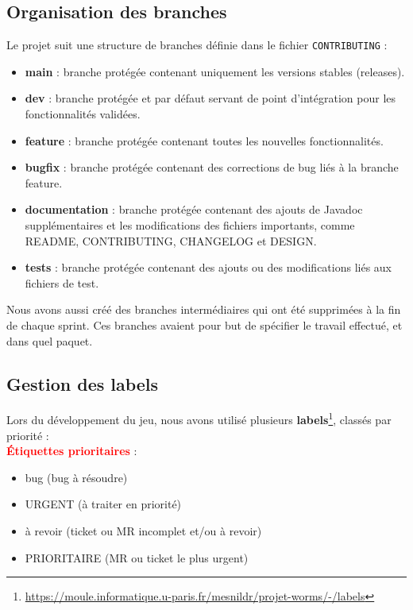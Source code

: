 \documentclass[a4paper, 12pt]{article}
\begin{document}
        \subsection{Organisation des branches}
            Le projet suit une structure de branches définie dans le fichier \texttt{CONTRIBUTING} :
            \begin{itemize}
                \item \textbf{main} : branche protégée contenant uniquement les versions stables (releases).
                \item \textbf{dev} : branche protégée et par défaut servant de point d'intégration pour les fonctionnalités validées.
                \item \textbf{feature} : branche protégée contenant toutes les nouvelles fonctionnalités.
                \item \textbf{bugfix} : branche protégée contenant des corrections de bug liés à la branche feature.
                \item \textbf{documentation} : branche protégée contenant des ajouts de Javadoc supplémentaires et les modifications des fichiers importants, comme README, CONTRIBUTING, CHANGELOG et DESIGN.
                \item \textbf{tests} : branche protégée contenant des ajouts ou des modifications liés aux fichiers de test.
            \end{itemize}
            Nous avons aussi créé des branches intermédiaires qui ont été supprimées à la fin de chaque sprint. Ces branches avaient pour but de spécifier le travail effectué, et dans quel paquet.

        \subsection{Gestion des labels}
            Lors du développement du jeu, nous avons utilisé plusieurs \textbf{labels}\footnote{\href{https://moule.informatique.u-paris.fr/mesnildr/projet-worms/-/labels}{https://moule.informatique.u-paris.fr/mesnildr/projet-worms/-/labels}}, classés par priorité :\\
            \newline
            \textcolor{red}{\textbf{Étiquettes prioritaires}} :\\
                \begin{itemize}
                    \item bug (bug à résoudre)
                    \item URGENT (à traiter en priorité)
                    \item à revoir (ticket ou MR incomplet et/ou à revoir)
                    \item PRIORITAIRE (MR ou ticket le plus urgent)
                \end{itemize}
\end{document}
